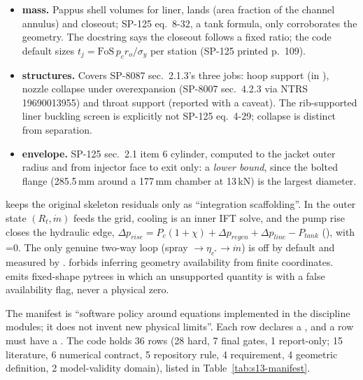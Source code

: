 \begin{itemize}
\item \textbf{mass.} Pappus shell volumes for liner, lands (area fraction of the channel annulus) and closeout; SP-125 eq.~8-32, a tank formula, only corroborates the geometry. The docstring says the closeout follows a fixed ratio; the code default  sizes $t_j=\mathrm{FoS}\,p_c r_o/\sigma_y$ per station (SP-125 printed p.~109).
\item \textbf{structures.} Covers SP-8087 sec.~2.1.3's three jobs: hoop support (in ), nozzle collapse under overexpansion (SP-8007 sec.~4.2.3 via NTRS 19690013955) and throat support (reported with a caveat). The rib-supported liner buckling screen is explicitly not SP-125 eq.~4-29; collapse is distinct from separation.
\item \textbf{envelope.} SP-125 sec.~2.1 item 6 cylinder, computed to the jacket outer radius and from injector face to exit only: a \emph{lower bound}, since the bolted flange (285.5\,mm around a 177\,mm chamber at 13\,kN) is the largest diameter.
\end{itemize}

 keeps the original skeleton residuals only as ``integration scaffolding''. In  the outer state $(R_t,\dot m)$ feeds the grid, cooling is an inner IFT solve, and the pump rise closes the hydraulic edge, $\Delta p_{rise}=P_c(1+\chi)+\Delta p_{regen}+\Delta p_{line}-P_{tank}$ (), with =0. The only genuine two-way loop (spray $\rightarrow\eta_{c^*}\rightarrow\dot m$) is off by default and measured by .  forbids inferring geometry availability from finite coordinates.  emits fixed-shape pytrees in which an unsupported quantity is  with a false availability flag, never a physical zero.

The manifest is ``software policy around equations implemented in the discipline modules; it does not invent new physical limits''. Each row declares a , and a  row must have a . The code holds 36 rows (28 hard, 7 final gates, 1 report-only; 15 literature, 6 numerical contract, 5 repository rule, 4 requirement, 4 geometric definition, 2 model-validity domain), listed in Table~\ref{tab:s13-manifest}.

